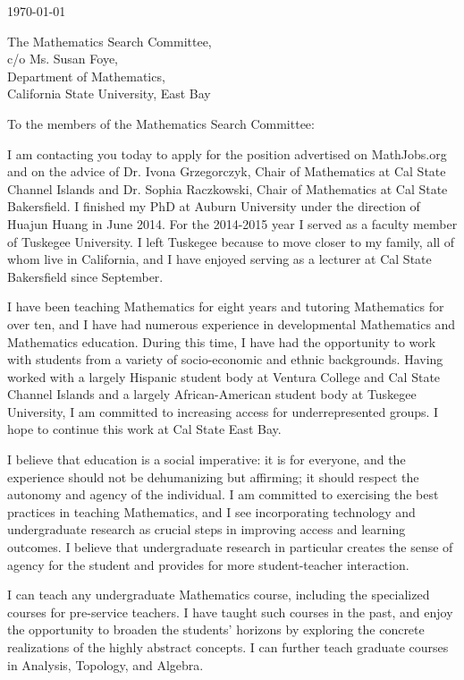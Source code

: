 \documentclass[10pt]{article}
\begin{document}
\makeletterhead

\today

The Mathematics Search Committee,\\
c/o Ms. Susan Foye,\\
Department of Mathematics,\\
California State University, East Bay

To the members of the Mathematics Search Committee:

I am contacting you today to apply for the position advertised on MathJobs.org
and on the advice of Dr. Ivona Grzegorczyk, Chair of Mathematics at Cal State Channel Islands
and Dr. Sophia Raczkowski, Chair of Mathematics at Cal State Bakersfield.
I finished my PhD at Auburn University under the direction of Huajun Huang in June 2014.
For the 2014-2015 year I served as a faculty member of Tuskegee University.
I left Tuskegee because to move closer to my family, all of whom live in California,
and I have enjoyed serving as a lecturer at Cal State Bakersfield since September.

I have been teaching Mathematics for eight years and tutoring Mathematics for over ten,
and I have had numerous experience in developmental Mathematics and Mathematics education.
During this time, I have had the opportunity to work with students from a variety of
socio-economic and ethnic backgrounds.
Having worked with a largely Hispanic student body at Ventura College and Cal State Channel
Islands and a largely African-American student body at Tuskegee University,
I am committed to increasing access for underrepresented groups.
I hope to continue this work at Cal State East Bay.

I believe that education is a social imperative:
it is for everyone, and the experience should not be dehumanizing but affirming;
it should respect the autonomy and agency of the individual.
I am committed to exercising the best practices in teaching Mathematics,
and I see incorporating technology and undergraduate research as crucial steps in improving access
and learning outcomes.
I believe that undergraduate research in particular creates the sense of agency for the student
and provides for more student-teacher interaction.

I can teach any undergraduate Mathematics course, including the specialized courses for
pre-service teachers.
I have taught such courses in the past, and enjoy the opportunity to broaden the students' horizons
by exploring the concrete realizations of the highly abstract concepts.
I can further teach graduate courses in Analysis, Topology, and Algebra.
\end{document}
